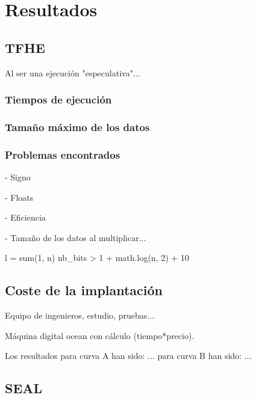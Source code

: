 \chapter{Resultados}
\label{chap:resultados}

\section{TFHE}

Al ser una ejecución "especulativa"...

\subsection{Tiempos de ejecución}

\subsection{Tamaño máximo de los datos}




\subsection{Problemas encontrados}

- Signo

- Floats

- Eficiencia


- Tamaño de los datos al multiplicar...

l = sum(1, n)
nb_bits > 1 + math.log(n, 2) + 10

\section{Coste de la implantación}

Equipo de ingenieros, estudio, pruebas...

Máquina digital ocean con cálculo (tiempo*precio).

Los resultados para curva A han sido: ...
para curva B han sido: ...

\section{SEAL}

